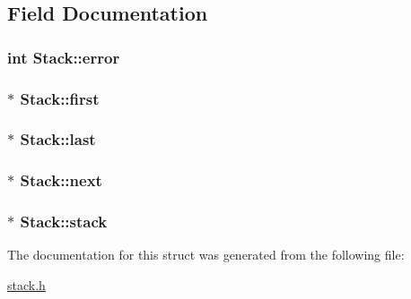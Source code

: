 \subsection{Field Documentation}
\hypertarget{structStack_a03bccc642450885750e515d97a17bfaf}{
\subsubsection[{error}]{\setlength{\rightskip}{0pt plus 5cm}int Stack\+::error}}\label{structStack_a03bccc642450885750e515d97a17bfaf}
\hypertarget{structStack_a9932a36ba07f484c43308e299658e0e3}{
\subsubsection[{first}]{$\ast$ Stack\+::first}}\label{structStack_a9932a36ba07f484c43308e299658e0e3}
\hypertarget{structStack_aa7b585e586d8923871ef36fe3f95810e}{
\subsubsection[{last}]{$\ast$ Stack\+::last}}\label{structStack_aa7b585e586d8923871ef36fe3f95810e}
\hypertarget{structStack_a4c04e7b5364862dbdfb45fe220ab4c96}{
\subsubsection[{next}]{$\ast$ Stack\+::next}}\label{structStack_a4c04e7b5364862dbdfb45fe220ab4c96}
\hypertarget{structStack_a3185fa37465828253fe2887b088f9410}{
\subsubsection[{stack}]{$\ast$ Stack\+::stack}}\label{structStack_a3185fa37465828253fe2887b088f9410}


The documentation for this struct was generated from the following file\+:\begin{DoxyCompactItemize}
\item 
\hyperlink{stack_8h}{stack.\+h}\end{DoxyCompactItemize}
